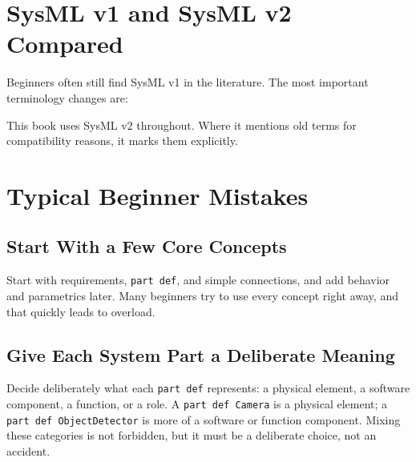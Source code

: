 \section{SysML v1 and SysML v2 Compared}
Beginners often still find SysML v1 in the literature. The most important terminology changes are:

\begin{center}
\end{center}

This book uses SysML v2 throughout. Where it mentions old terms for compatibility reasons, it marks them explicitly.

\section{Typical Beginner Mistakes}
\subsection{Start With a Few Core Concepts}
Start with requirements, \texttt{part def}, and simple connections, and add behavior and parametrics later. Many beginners try to use every concept right away, and that quickly leads to overload.

\subsection{Give Each System Part a Deliberate Meaning}
Decide deliberately what each \texttt{part def} represents: a physical element, a software component, a function, or a role. A \texttt{part def Camera} is a physical element; a \texttt{part def ObjectDetector} is more of a software or function component. Mixing these categories is not forbidden, but it must be a deliberate choice, not an accident.

